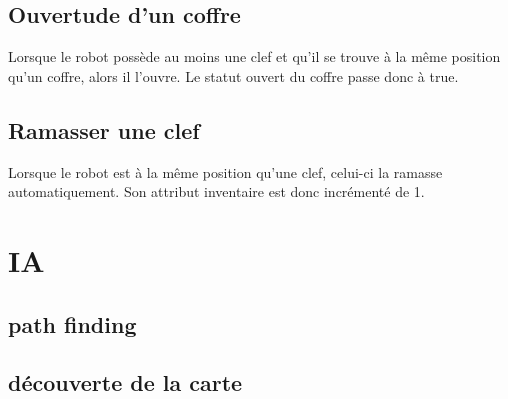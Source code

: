 \documentclass[a4paper 12pts]{article}
\begin{document}
\subsection {Ouvertude d'un coffre}

Lorsque le robot possède au moins une clef et qu'il se trouve à la même position qu'un coffre, alors il l'ouvre. Le statut ouvert du coffre passe donc à true.

\subsection {Ramasser une clef}

Lorsque le robot est à la même position qu'une clef, celui-ci la ramasse automatiquement. Son attribut inventaire est donc incrémenté de 1.



\section{IA}

\subsection{path finding}

\subsection{découverte de la carte}
\end{document}
